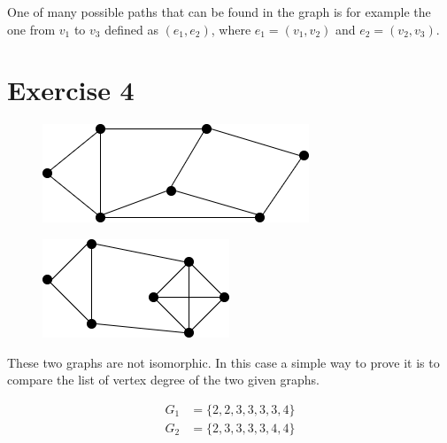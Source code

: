 \documentclass{article}
\begin{document}
    \par\noindent One of many possible paths that can be found in the graph is for example the one from \(v_{1}\) to \(v_{3}\) defined as \((e_{1},e_{2})\), where \(e_{1}=(v_{1},v_{2})\) and \(e_{2}=(v_{2},v_{3})\).

\section{Exercise 4}
    \begin{figure}[H]
        \centering
        \begin{minipage}[b]{0.5\textwidth}
            \includegraphics[width=\textwidth]{6.png}
            \label{fig:figure-4-a}
        \end{minipage}
        \hfill
        \begin{minipage}[b]{0.4\textwidth}
            \includegraphics[width=\textwidth]{7.png}
            \label{fig:figure-4-b}
        \end{minipage}
        \label{fig:figure-1}
    \end{figure}
    
    These two graphs are not isomorphic. In this case a simple way to prove it is to compare the list of vertex degree of the two given graphs.
    
    \begin{align*}
        G_{1} &= \{2,2,3,3,3,3,4\}\\
        G_{2} &= \{2,3,3,3,3,4,4\}
    \end{align*}
    
\end{document}
